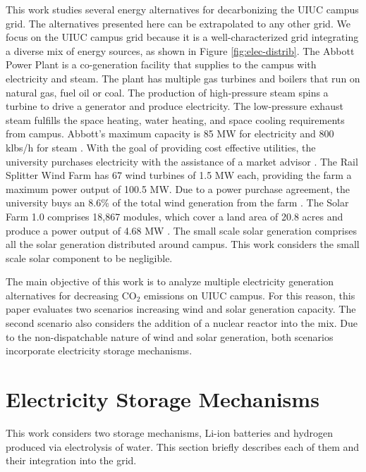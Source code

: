 \documentclass{anstrans}
\begin{document}
This work studies several energy alternatives for decarbonizing the \gls{UIUC} campus grid.
The alternatives presented here can be extrapolated to any other grid.
We focus on the \gls{UIUC} campus grid because it is a well-characterized grid integrating a diverse mix of energy sources, as shown in Figure \ref{fig:elec-distrib}.
The Abbott Power Plant is a co-generation facility that supplies to the campus with electricity and steam.
The plant has multiple gas turbines and boilers that run on natural gas, fuel oil or coal.
The production of high-pressure steam spins a turbine to drive a generator and produce electricity.
The low-pressure exhaust steam fulfills the space heating, water heating, and space cooling requirements from campus.
Abbott’s maximum capacity is 85 MW for electricity and 800 klbs/h for steam \cite{uiucfs_abbott_nodate}.
With the goal of providing cost effective utilities, the university purchases electricity with the assistance of a market advisor \cite{uiucfs_energy_2015}.
The Rail Splitter Wind Farm has 67 wind turbines of 1.5 MW each, providing the farm a maximum power output of 100.5 MW.
Due to a power purchase agreement, the university buys an 8.6\% of the total wind generation from the farm \cite{rail_splitter_illinois_2016, uiucfs_energy_2015}.
The Solar Farm 1.0 comprises 18,867 modules, which cover a land area of 20.8 acres and produce a power output of 4.68 MW \cite{uiucfs_solar_2017}.
The small scale solar generation comprises all the solar generation distributed around campus.
This work considers the small scale solar component to be negligible.

The main objective of this work is to analyze multiple electricity generation alternatives for decreasing CO$_2$ emissions on UIUC campus.
For this reason, this paper evaluates two scenarios increasing wind and solar generation capacity.
The second scenario also considers the addition of a nuclear reactor into the mix.
Due to the non-dispatchable nature of wind and solar generation, both scenarios incorporate electricity storage mechanisms.


\section{Electricity Storage Mechanisms}

This work considers two storage mechanisms, Li-ion batteries and hydrogen produced via electrolysis of water.
This section briefly describes each of them and their integration into the grid.
\end{document}
